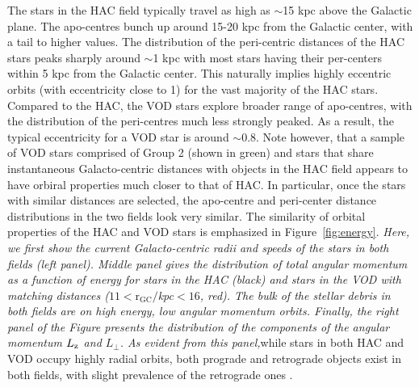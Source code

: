 \documentclass[fleqn,usenatbib]{mnras}
\begin{document}
The stars in the HAC field typically travel as high as $\sim$15 kpc
above the Galactic plane. The apo-centres bunch up around 15-20 kpc
from the Galactic center, with a tail to higher values. The
distribution of the peri-centric distances of the HAC stars peaks
sharply around $\sim$1 kpc with most stars having their per-centers
within 5 kpc from the Galactic center. This naturally implies highly
eccentric orbits (with eccentricity close to 1) for the vast majority
of the HAC stars. Compared to the HAC, the VOD stars explore broader
range of apo-centres, with the distribution of the peri-centres much
less strongly peaked. As a result, the typical eccentricity for a VOD
star is around $\sim$0.8. Note however, that a sample of VOD stars
comprised of Group 2 (shown in green) and stars that share
instantaneous Galacto-centric distances with objects in the HAC field
appears to have orbiral properties much closer to that of HAC. In
particular, once the stars with similar distances are selected, the
apo-centre and peri-center distance distributions in the two fields
look very similar. The similarity of orbital properties of the HAC and
VOD stars is emphasized in Figure~\ref{fig:energy}. \textit{Here, we first
show the current Galacto-centric radii and speeds of the stars in both
fields (left panel). Middle panel gives the distribution of total
angular momentum as a function of energy for stars in the HAC (black)
and stars in the VOD with matching distances
($11\mathrm{<r_{GC}}/$kpc$<16$, red). The bulk of the stellar debris
in both fields are on high energy, low angular momentum
orbits. Finally, the right panel of the Figure presents the
distribution of the components of the angular momentum $L_{\rm z}$ and
$L_{\perp}$. As evident from this panel,}while stars in both HAC and
VOD occupy highly radial orbits, both prograde and retrograde objects
exist in both fields, with slight prevalence of the retrograde ones
\citep[see also][]{actionhalo,shards,Helmi2018}.
%
\end{document}
